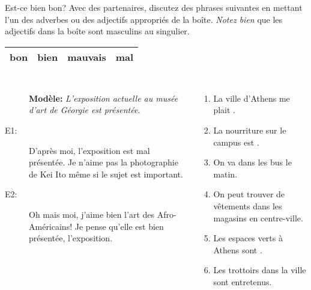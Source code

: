 \begin{frame}{Est-ce bien bon?}
  \small
  Avec des partenaires, discutez des phrases suivantes en mettant  l'un des adverbes ou des adjectifs appropriés de la boîte.
  \emph{Notez bien} que les adjectifs dans la boîte sont masculins au singulier.
  \begin{center}
    \begin{tabular}{| l l l l |}
      \hline
      bon & bien & mauvais & mal \\
      \hline
    \end{tabular}
  \end{center}
  \begin{columns}[t]
    \scriptsize
      \begin{description}
        \item[] \textbf{Modèle:} \emph{L'exposition actuelle au musée d'art de Géorgie est \underline{\hspace{1.25cm}} présentée.}
        \item[E1:] D'après moi, l'exposition est \alert{mal} présentée. Je n'aime pas la photographie de Kei Ito même si le sujet est important.
        \item[E2:] Oh mais moi, j'aime bien l'art des Afro-Américains! Je pense qu'elle est \alert{bien} présentée, l'exposition.
      \end{description}
      \begin{enumerate}
        \item La ville d'Athens me plait \underline{\hspace{1.25cm}}.
        \item La nourriture sur le campus est \underline{\hspace{1.25cm}}.
        \item On va \underline{\hspace{1.25cm}} dans les bus le matin.
        \item On peut trouver de \underline{\hspace{1.25cm}} vêtements dans les magasins en centre-ville.
        \item Les espaces verts à Athens sont \underline{\hspace{1.25cm}}.
        \item Les trottoirs dans la ville sont \underline{\hspace{1.25cm}} entretenus.
      \end{enumerate}
  \end{columns}
\end{frame}